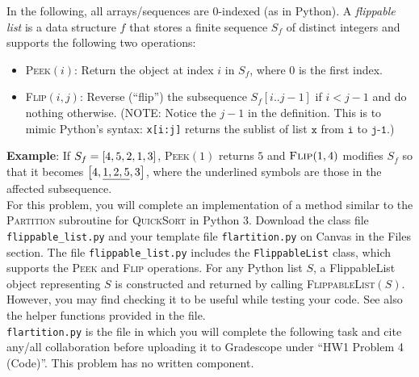 \documentclass[11pt]{article}
\begin{document}
\pagebreak
\begin{question}

In the following, all arrays/sequences are $0$-indexed (as in Python). A \emph{flippable list} is a data structure $f$ that stores a finite sequence $S_f$ of distinct integers and supports the following two operations:
	\begin{itemize}
		\item \textsc{Peek}$(i)$: Return the object at index $i$ in $S_f$, where $0$ is the first index.
		\item \textsc{Flip}$(i,j)$: Reverse (``flip'') the subsequence $S_f[i..j-1]$ if $i < j-1$ and do nothing otherwise. (NOTE: Notice the $j-1$ in the definition. This is to mimic Python's syntax: \texttt{x[i:j]} returns the sublist of list $\texttt{x}$ from $\texttt{i}$ to $\texttt{j-1}$.)
	\end{itemize}
	
	\textbf{Example}: If $S_f = \left[ 4, 5, 2, 1, 3 \right]$, \textsc{Peek}$(1)$ returns $5$ and $\textsc{Flip}(1,4)$ modifies $S_f$ so that it becomes $\left[ 4, \underline{1, 2, 5}, 3 \right]$, where the underlined symbols are those in the affected subsequence.\\

For this problem, you will complete an implementation of a method similar to the \textsc{Partition} subroutine for \textsc{QuickSort} in Python 3. Download the class file \texttt{flippable\_list.py} and your template file \texttt{flartition.py} on Canvas in the Files section. The file \texttt{flippable\_list.py} includes the \texttt{FlippableList} class, which supports the \textsc{Peek} and \textsc{Flip} operations. For any Python list $S$, a FlippableList object representing $S$ is constructed and returned by calling \textsc{FlippableList}$(S)$.  However, you may find checking it to be useful while testing your code. See also the helper functions provided in the file.\\

\texttt{flartition.py} is the file in which you will complete the following task and cite any/all collaboration before uploading it to Gradescope under ``HW1 Problem 4 (Code)''. This problem has no written component.\\


\end{question}
\end{document}
